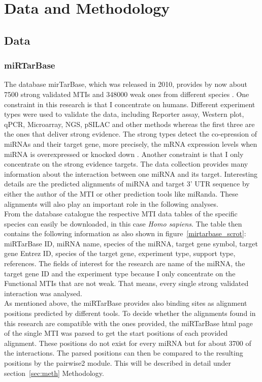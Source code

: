 \documentclass[11pt,  a4paper]{report}
\begin{document}
\vspace{1.5cm}


\chapter{Data and Methodology}
\label{chapter:data and methodology}

 
\section{Data} 
\subsection{miRTarBase}
The database mirTarBase, which was released in 2010, provides by now about 7500 strong validated MTIs and 348000 weak ones from different species \cite{Chou}. One constraint in this research is that I concentrate on humans. Different experiment types were used to validate the data, including Reporter assay, Western plot, qPCR, Microarray, NGS, pSILAC and other methods whereas the first three are the ones that deliver strong evidence. The strong types detect the co-epression of miRNAs and their target gene, more precisely, the mRNA expression levels when miRNA is overexpressed or knocked down  \cite{Hsu}. Another constraint is that I only concentrate on the strong evidence targets. The data collection provides many information about the interaction between one miRNA and its target. Interesting details are the predicted alignments of miRNA and target 3' UTR sequence by either the author of the MTI or other prediction tools like miRanda. These alignments will also play an important role in the following analyses. \\

From the database catalogue the respective MTI data tables of the specific species can easily be downloaded, in this case \textit{Homo sapiens}. The table then contains the following information as also shown in figure~\ref{mirtarbase_scrot}: miRTarBase ID, miRNA name, species of the miRNA, target gene symbol, target gene Entrez ID, species of the target gene, experiment type, support type, references. The fields of interest for the research are name of the miRNA, the target gene ID and the experiment type because I only concentrate on the Functional MTIs that are not weak. That means, every single strong validated interaction was analysed.\\

As mentioned above, the miRTarBase provides also binding sites as alignment positions predicted by different tools. To decide whether the alignments found in this research are compatible with the ones provided, the miRTarBase html page of the single MTI was parsed to get the start positions of each provided alignment. These positions do not exist for every miRNA but for about 3700 of the interactions. The parsed positions can then be compared to the resulting positions by the pairwise2 module. This will be described in detail under section~\ref{sec:meth} Methodology.\\ 
\end{document}
